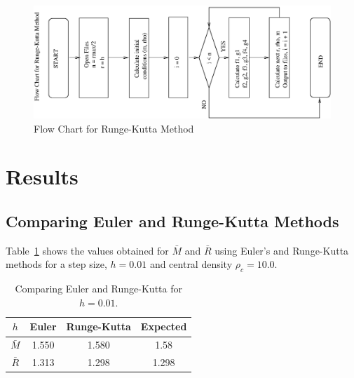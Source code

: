 \documentclass[a4paper]{IEEEtran}
\begin{document}
    \begin{figure}
    \caption{Flow Chart for Runge-Kutta Method}
    \label{fig:runge-kutta} 
    \begin{center}
        \includegraphics[width=\columnwidth,angle=-90]{figures/flow.eps}
    \end{center}
    \end{figure} 


\section{Results}


    \subsection{Comparing Euler and Runge-Kutta Methods}
    Table~\ref{tbl:euler-runge-kutta} shows the values obtained for $\bar{M}$
    and $\bar{R}$ using Euler's and Runge-Kutta methods for
    a step size, $h = 0.01$ and central density $\rho_c = 10.0$.

    \begin{table}
    \caption{Comparing Euler and Runge-Kutta for $h=0.01$.} 
    \label{tbl:euler-runge-kutta} 
    \begin{center}
    \begin{tabular}{c|ccc} \hline
    $h$                 & Euler     & Runge-Kutta & Expected\\ \hline 
    $\bar{M}$           & 1.550     & 1.580       & 1.58    \\ 
    $\bar{R}$           & 1.313     & 1.298       & 1.298\\ \hline
    \end{tabular}
    \end{center}
    \end{table} 
\end{document}
